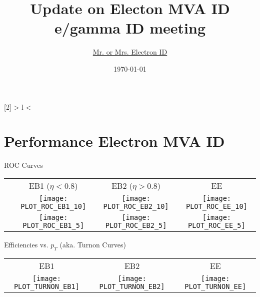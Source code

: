 
\usepackage{pdfpages}
\usepackage{adjustbox}
\usepackage{array}
\usepackage{booktabs}
\usepackage{multirow}

\newcolumntype{R}[2]{%
    >{\bgroup}%
    l%
    <{\egroup}%
}

\newcommand*\rot{\multicolumn{1}{R{45}{1em}}}%

\title[Your Short Title]{Update on Electon MVA ID\\e/gamma ID meeting}
\author{
    \underline{Mr. or Mrs. Electron ID}
}
\date{\today}



\begin{frame}
  \titlepage
\end{frame}

\section{Performance Electron MVA ID}

\begin{frame}{ROC Curves}
    \begin{table}[]
\begin{tabular}{cccc}
    {} & EB1 ($\eta < 0.8$) & EB2 ($\eta > 0.8$) & EE \\
    \raisebox{0.7\totalheight}{\rotatebox[origin=c]{90}{$10~\mathrm{GeV}< p_{T}$}} &
    \texttt{[image: PLOT\_ROC\_EB1\_10]} &
    \texttt{[image: PLOT\_ROC\_EB2\_10]} &
    \texttt{[image: PLOT\_ROC\_EE\_10]} \\
    \raisebox{0.55\totalheight}{\rotatebox[origin=c]{90}{$5 < p_{T} < 10~\mathrm{GeV}$}} &
    \texttt{[image: PLOT\_ROC\_EB1\_5]} &
    \texttt{[image: PLOT\_ROC\_EB2\_5]} &
    \texttt{[image: PLOT\_ROC\_EE\_5]} \\
\end{tabular}
    \end{table}
\end{frame}

\begin{frame}{Efficiencies vs. $p_T$ (aka. Turnon Curves)}
    \begin{table}[]
\begin{tabular}{ccc}
    EB1 & EB2 & EE \\
    \texttt{[image: PLOT\_TURNON\_EB1]} &
    \texttt{[image: PLOT\_TURNON\_EB2]} &
    \texttt{[image: PLOT\_TURNON\_EE]} \\
\end{tabular}
    \end{table}
\end{frame}

